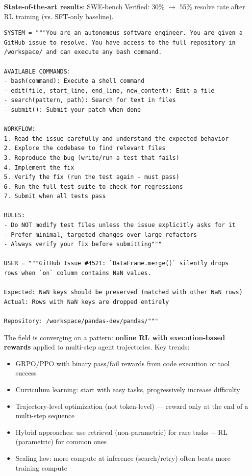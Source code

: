 \textbf{State-of-the-art results}: SWE-bench Verified: 30\% $\rightarrow$ 55\% resolve rate after RL training (vs. SFT-only baseline).

\begin{examplebox}
\begin{lstlisting}[style=pythonstyle]
SYSTEM = """You are an autonomous software engineer. You are given a
GitHub issue to resolve. You have access to the full repository in
/workspace/ and can execute any bash command.

AVAILABLE COMMANDS:
- bash(command): Execute a shell command
- edit(file, start_line, end_line, new_content): Edit a file
- search(pattern, path): Search for text in files
- submit(): Submit your patch when done

WORKFLOW:
1. Read the issue carefully and understand the expected behavior
2. Explore the codebase to find relevant files
3. Reproduce the bug (write/run a test that fails)
4. Implement the fix
5. Verify the fix (run the test again - must pass)
6. Run the full test suite to check for regressions
7. Submit when all tests pass

RULES:
- Do NOT modify test files unless the issue explicitly asks for it
- Prefer minimal, targeted changes over large refactors
- Always verify your fix before submitting"""

USER = """GitHub Issue #4521: `DataFrame.merge()` silently drops
rows when `on` column contains NaN values.

Expected: NaN keys should be preserved (matched with other NaN rows)
Actual: Rows with NaN keys are dropped entirely

Repository: /workspace/pandas-dev/pandas/"""
\end{lstlisting}
\end{examplebox}

\begin{intuitionbox}
The field is converging on a pattern: \textbf{online RL with execution-based rewards} applied to multi-step agent trajectories. Key trends:

\begin{itemize}
  \item GRPO/PPO with binary pass/fail rewards from code execution or tool success
  \item Curriculum learning: start with easy tasks, progressively increase difficulty
  \item Trajectory-level optimization (not token-level) --- reward only at the end of a multi-step sequence
  \item Hybrid approaches: use retrieval (non-parametric) for rare tasks + RL (parametric) for common ones
  \item Scaling law: more compute at inference (search/retry) often beats more training compute
\end{itemize}
\end{intuitionbox}


